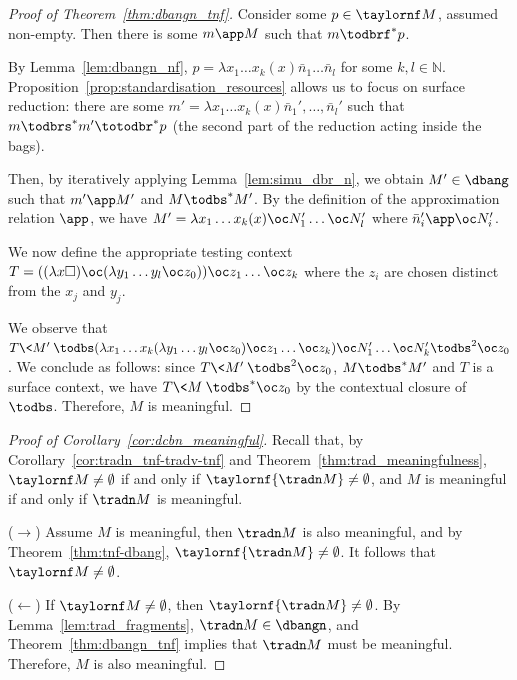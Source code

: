 \begin{proof}[Proof of Theorem~\ref{thm:dbangn_tnf}]
	Consider some
	$p\in\taylornf M$, assumed non-empty. Then there is some $m\app M$ such
	that $m\todbrf^*p$.

	By Lemma~\ref{lem:dbangn_nf}, $p=\lambda x_1\dots x_k(x)\bar n_1\dots \bar n_l$
	for some $k,l\in\mathbb N$.
	Proposition~\ref{prop:standardisation_resources} allows us to focus on
	surface reduction: there are some $m'=\lambda
	x_1\dots x_k(x)\bar
	n_1',\dots ,\bar n_l'$ such that $m\todbrs^* m'\totodbr^* p$ (the second part
	of the reduction acting inside the bags).

	Then, by iteratively applying Lemma~\ref{lem:simu_dbr_n}, we obtain $M'\in\dbang$
	such that $m'\app M'$ and $M\todbs^*M'$. By the definition of
	the approximation relation $\app$, we have $M'=\lambda x_1\dots x_k(x)\oc
	N'_1\dots \oc N'_l$ where $\bar n_i'\app \oc N'_i$.


	We now define the appropriate testing context $T= ((\lambda x
	\square) \oc(\lambda y_1\dots y_l\oc z_0))\oc z_1\dots \oc z_k$
	where the $z_i$ are chosen distinct from the $x_j$ and $y_j$.

	We observe that $T\<M'\>\todbs (\lambda x_1\dots x_k(\lambda y_1\dots y_l\oc
	z_0)\oc z_1\dots \oc z_k)\oc N_1'\dots \oc N_k'\todbs^2\oc z_0$.
	We conclude as follows: since $T\<M'\>\todbs^2\oc z_0$, $M\todbs^*M'$ and $T$ is a surface
	context, we have $T\<M\>\todbs^*\oc z_0$ by the contextual closure of
	$\todbs$. Therefore, $M$ is meaningful.
\end{proof}

\begin{proof}[Proof of Corollary~\ref{cor:dcbn_meaningful}]
	Recall that, by Corollary~\ref{cor:tradn_tnf-tradv-tnf} and Theorem~\ref{thm:trad_meaningfulness}, 
	$\taylornf M\neq\emptyset$ if and
	only if $\taylornf {\tradn M}\neq\emptyset$, and $M$ is meaningful if
	and only if $\tradn M$ is meaningful.

	($\to$) Assume $M$ is meaningful, then $\tradn M$ is also meaningful, and
	by Theorem~\ref{thm:tnf-dbang}, $\taylornf{\tradn M}\neq \emptyset$.
	It follows that $\taylornf M\neq\emptyset$.

	($\leftarrow$) If $\taylornf M\neq\emptyset$, then $\taylornf{\tradn
	M}\neq\emptyset$. By Lemma~\ref{lem:trad_fragments}, $\tradn
	M\in\dbangn$, and Theorem~\ref{thm:dbangn_tnf} implies that $\tradn M$
	must be meaningful. Therefore, $M$ is also meaningful.
\end{proof}

